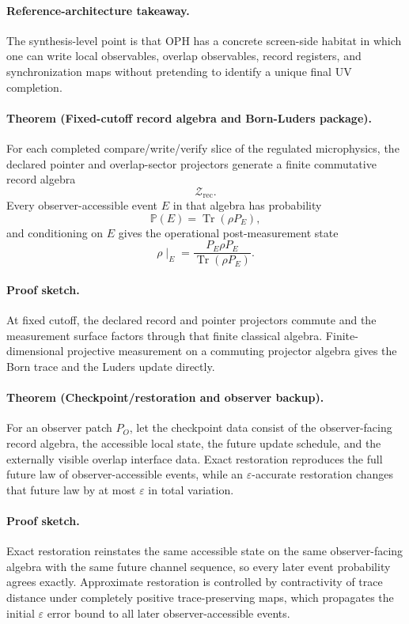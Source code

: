 \paragraph{Reference-architecture takeaway.}
The synthesis-level point is that OPH has a concrete screen-side habitat in which one can
write local observables, overlap observables, record registers, and synchronization maps without
pretending to identify a unique final UV completion.

\paragraph{Theorem (Fixed-cutoff record algebra and Born-Luders package).}
For each completed compare/write/verify slice of the regulated microphysics, the declared pointer
and overlap-sector projectors generate a finite commutative record algebra
\[
\mathcal Z_{\mathrm{rec}}.
\]
Every observer-accessible event \(E\) in that algebra has probability
\[
\mathbb P(E)=\operatorname{Tr}(\rho P_E),
\]
and conditioning on \(E\) gives the operational post-measurement state
\[
\rho\!\mid_E = \frac{P_E \rho P_E}{\operatorname{Tr}(\rho P_E)}.
\]

\paragraph{Proof sketch.}
At fixed cutoff, the declared record and pointer projectors commute and the measurement surface
factors through that finite classical algebra. Finite-dimensional projective measurement on a
commuting projector algebra gives the Born trace and the Luders update directly.

\paragraph{Theorem (Checkpoint/restoration and observer backup).}
For an observer patch \(P_O\), let the checkpoint data consist of the observer-facing record
algebra, the accessible local state, the future update schedule, and the externally visible
overlap interface data. Exact restoration reproduces the full future law of observer-accessible
events, while an \(\varepsilon\)-accurate restoration changes that future law by at most
\(\varepsilon\) in total variation.

\paragraph{Proof sketch.}
Exact restoration reinstates the same accessible state on the same observer-facing algebra with
the same future channel sequence, so every later event probability agrees exactly. Approximate
restoration is controlled by contractivity of trace distance under completely positive
trace-preserving maps, which propagates the initial \(\varepsilon\) error bound to all later
observer-accessible events.

